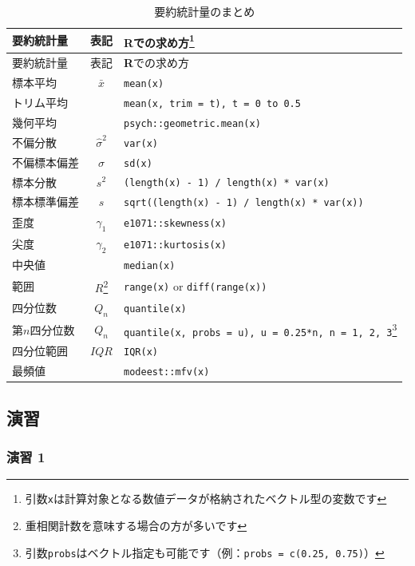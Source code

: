 \documentclass[
  12pt,
]{book}
\begin{document}
\begin{longtable}[]{@{}lcl@{}}
\caption{要約統計量のまとめ}\tabularnewline
\toprule
要約統計量 & 表記 & \textbf{R}での求め方\footnote{引数\texttt{x}は計算対象となる数値データが格納されたベクトル型の変数です} \\
\midrule
\endfirsthead
\toprule
要約統計量 & 表記 & \textbf{R}での求め方{} \\
\midrule
\endhead
標本平均 & \(\bar{x}\) & \texttt{mean(x)} \\
トリム平均 & & \texttt{mean(x,\ trim\ =\ t),\ t\ =\ 0\ to\ 0.5} \\
幾何平均 & & \texttt{psych::geometric.mean(x)} \\
不偏分散 & \(\hat{\sigma}^2\) & \texttt{var(x)} \\
不偏標本偏差 & \(\hat{\sigma}\) & \texttt{sd(x)} \\
標本分散 & \(s^2\) & \texttt{(length(x)\ -\ 1)\ /\ length(x)\ *\ var(x)} \\
標本標準偏差 & \(s\) & \texttt{sqrt((length(x)\ -\ 1)\ /\ length(x)\ *\ var(x))} \\
歪度 & \(\gamma_1\) & \texttt{e1071::skewness(x)} \\
尖度 & \(\gamma_2\) & \texttt{e1071::kurtosis(x)} \\
中央値 & & \texttt{median(x)} \\
範囲 & \(R\)\footnote{重相関計数を意味する場合の方が多いです} & \texttt{range(x)} or \texttt{diff(range(x))} \\
四分位数 & \(Q_n\) & \texttt{quantile(x)} \\
第\(n\)四分位数 & \(Q_n\) & \texttt{quantile(x,\ probs\ =\ u),\ u\ =\ 0.25*n,\ n\ =\ 1,\ 2,\ 3}\footnote{引数\texttt{probs}はベクトル指定も可能です（例：\texttt{probs\ =\ c(0.25,\ 0.75)}）} \\
四分位範囲 & \(IQR\) & \texttt{IQR(x)} \\
最頻値 & & \texttt{modeest::mfv(x)} \\
\bottomrule
\end{longtable}

\newpage

\hypertarget{ux6f14ux7fd2}{%
\subsection{演習}\label{ux6f14ux7fd2}}

\hypertarget{ux6f14ux7fd2-1}{%
\subsubsection*{演習 1}\label{ux6f14ux7fd2-1}}
\end{document}
